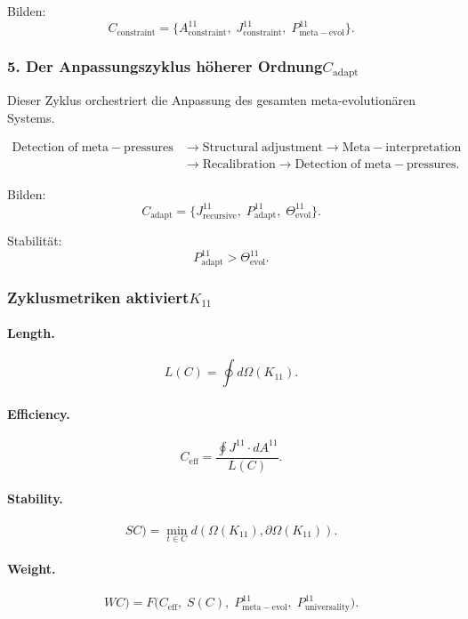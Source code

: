 Bilden:
\[
 C_{\mathrm{constraint}}
 =
 \{
   A^{11}_{\mathrm{constraint}},\;
   J^{11}_{\mathrm{constraint}},\;
   P^{11}_{\mathrm{meta\!-\!evol}}
 \}.
\]


\subsubsection{5. Der Anpassungszyklus höherer Ordnung$C_{\mathrm{adapt}}$}

Dieser Zyklus orchestriert die Anpassung des gesamten meta-evolutionären Systems.

\[
  \begin{aligned}
  \mathrm{Detection\;of\;meta\!-\!pressures}
  &\to \mathrm{Structural\;adjustment}
  \to \mathrm{Meta\!-\!interpretation}\\
  &\to \mathrm{Recalibration}
  \to \mathrm{Detection\;of\;meta\!-\!pressures}.
  \end{aligned}
\]

Bilden:
\[
  C_{\mathrm{adapt}}
  =
  \{
    J^{11}_{\mathrm{recursive}},\;
    P^{11}_{\mathrm{adapt}},\;
    \Theta^{11}_{\mathrm{evol}}
  \}.
\]

Stabilität:
\[
  P^{11}_{\mathrm{adapt}}>\Theta^{11}_{\mathrm{evol}}.
\]


\subsubsection{Zyklusmetriken aktiviert$K_{11}$}

\paragraph{Length.}
\[
  L(C)=\oint d\Omega(K_{11}).
\]

\paragraph{Efficiency.}
\[
  C_{\mathrm{eff}}
  =\frac{\oint J^{11}\cdot dA^{11}}{L(C)}.
\]

\paragraph{Stability.}
\[
SC)
  =\min_{t\in C} d(\Omega(K_{11}),\partial\Omega(K_{11})).
\]

\paragraph{Weight.}
\[
WC)
  =F\!\big(
        C_{\mathrm{eff}},\;
        S(C),\;
        P^{11}_{\mathrm{meta\!-\!evol}},\;
        P^{11}_{\mathrm{universality}}
      \big).
\]



